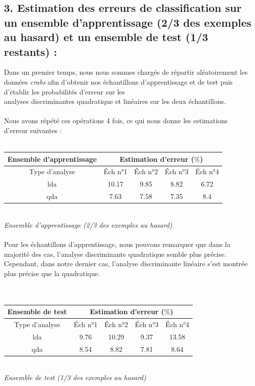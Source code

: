 \documentclass[a4paper, 10pt]{article}
\begin{document}
\subsection*{3. Estimation des erreurs de classification sur un ensemble d'apprentissage (2/3 des exemples au hasard)
et un ensemble de test (1/3 restants) :}
Dans un premier temps, nous nous sommes chargés de répartir aléatoirement les données \textit{crabs} afin d'obtenir nos échantillons
d'apprentissage et de test puis d'établir les probabilités d'erreur sur les\\analyses discriminantes quadratique et linéaires
sur les deux échantillons.\\ \\
Nous avons répété ces opérations 4 fois, ce qui nous donne les estimations d'erreur suivantes :\\ \\
\begin{tabular}{|c|c|c|c|c|}
\hline
\textbf{Ensemble d'apprentissage} & \multicolumn{4}{|c|}{Estimation d'erreur ($\%$)} \\
\hline
Type d'analyse & Éch n°1 & Éch n°2 & Éch n°3 & Éch n°4 \\
\hline
lda & 10.17 & 9.85 & 8.82 & 6.72 \\
\hline
qda & 7.63 & 7.58 & 7.35 & 8.4 \\
\hline
\end{tabular}\\
\textit{Ensemble d'apprentissage (2/3 des exemples au hasard)}\\ \\
Pour les échantillons d'apprentissage, nous pouvons remarquer que dans la majorité des cas,
l'analyse discriminante quadratique semble plus précise.
Cependant, dans notre dernier cas, l'analyse discriminante linéaire s'est montrée plus précise que la quadratique.\\ \\ \\
\begin{tabular}{|c|c|c|c|c|}
\hline
\textbf{Ensemble de test} & \multicolumn{4}{|c|}{Estimation d'erreur ($\%$)} \\
\hline
Type d'analyse & Éch n°1 & Éch n°2 & Éch n°3 & Éch n°4 \\
\hline
lda & 9.76 & 10.29 & 9.37 & 13.58 \\
\hline
qda & 8.54 & 8.82 & 7.81 & 8.64 \\
\hline
\end{tabular}\\
\textit{Ensemble de test (1/3 des exemples au hasard)}\\ \\
\end{document}
